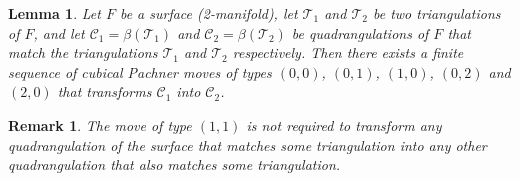 \documentclass{amsart}
\newtheorem{lemma}{Lemma}
\newtheorem{remark}{Remark}
\begin{document}
\begin{lemma}
    \label{Lemma:MatchTransforms}
    Let $F$ be a surface (2-manifold), let $\mathcal{T}_1$ and $\mathcal{T}_2$ be two triangulations of $F$, and let $\mathcal{C}_1 = \beta(\mathcal{T}_1)$ and $\mathcal{C}_2 = \beta(\mathcal{T}_2)$ be quadrangulations of $F$ that match the triangulations $\mathcal{T}_1$ and $\mathcal{T}_2$ respectively. Then there exists a finite sequence of cubical Pachner moves of types $(0, 0)$, $(0, 1)$, $(1, 0)$, $(0, 2)$ and $(2, 0)$ that transforms $\mathcal{C}_1$ into $\mathcal{C}_2$.
\end{lemma}
\begin{remark}
    The move of type $(1, 1)$ is not required to transform any quadrangulation of the surface that matches some triangulation into any other quadrangulation that also matches some triangulation.
\end{remark}
\end{document}
